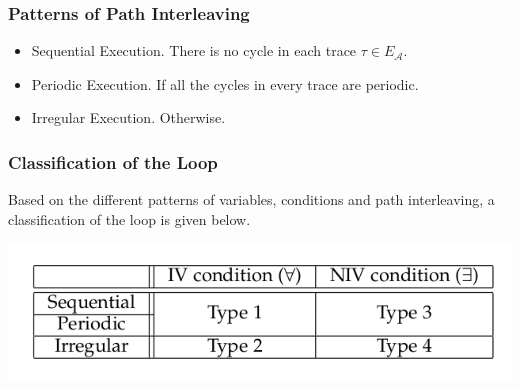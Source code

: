 \documentclass[11pt]{beamer}
\begin{document}
\begin{frame}\frametitle{Patterns of Path Interleaving}
\begin{itemize}
\item Sequential Execution. There is no cycle in each trace $\tau\in E_\mathcal{A}$.
\item Periodic Execution. If all the cycles in every trace are  periodic.
\item Irregular Execution. Otherwise.
\end{itemize}
\end{frame}

\begin{frame}\frametitle{Classification of the Loop}
Based on the different patterns of variables, conditions and path interleaving, a classification of the loop is given below.
\begin{center}
\includegraphics[scale=0.4]{classification.png}
\end{center}
\end{frame}
\end{document}
